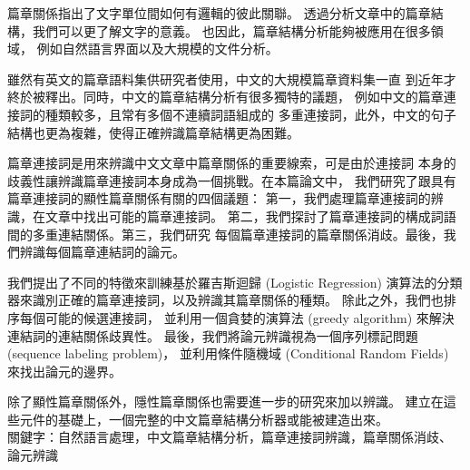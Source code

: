 \begin{abstractzh}

篇章關係指出了文字單位間如何有邏輯的彼此關聯。
透過分析文章中的篇章結構，我們可以更了解文字的意義。
也因此，篇章結構分析能夠被應用在很多領域，
例如自然語言界面以及大規模的文件分析。

雖然有英文的篇章語料集供研究者使用，中文的大規模篇章資料集一直
到近年才終於被釋出。同時，中文的篇章結構分析有很多獨特的議題，
例如中文的篇章連接詞的種類較多，且常有多個不連續詞語組成的
多重連接詞，此外，中文的句子結構也更為複雜，使得正確辨識篇章結構更為困難。

篇章連接詞是用來辨識中文文章中篇章關係的重要線索，可是由於連接詞
本身的歧義性讓辨識篇章連接詞本身成為一個挑戰。在本篇論文中，
我們研究了跟具有篇章連接詞的顯性篇章關係有關的四個議題：
第一，我們處理篇章連接詞的辨識，在文章中找出可能的篇章連接詞。
第二，我們探討了篇章連接詞的構成詞語間的多重連結關係。第三，我們研究
每個篇章連接詞的篇章關係消歧。最後，我們辨識每個篇章連結詞的論元。

我們提出了不同的特徵來訓練基於羅吉斯迴歸 (Logistic Regression)
演算法的分類器來識別正確的篇章連接詞，以及辨識其篇章關係的種類。
除此之外，我們也排序每個可能的候選連接詞，
並利用一個貪婪的演算法 (greedy algorithm) 來解決連結詞的連結關係歧異性。
最後，我們將論元辨識視為一個序列標記問題 (sequence labeling problem)，
並利用條件隨機域 (Conditional Random Fields) 來找出論元的邊界。

除了顯性篇章關係外，隱性篇章關係也需要進一步的研究來加以辨識。
建立在這些元件的基礎上，一個完整的中文篇章結構分析器或能被建造出來。 \\

\noindent
關鍵字：自然語言處理，中文篇章結構分析，篇章連接詞辨識，篇章關係消歧、
論元辨識

\end{abstractzh}

